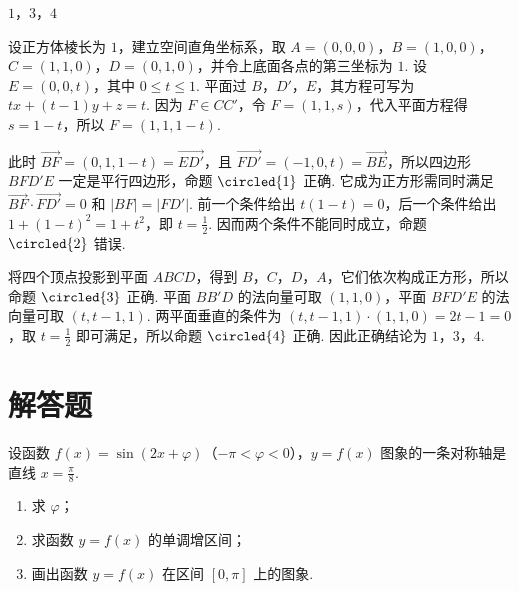 \begin{answer}
\(1\)，\(3\)，\(4\)
\end{answer}

\begin{solution}
设正方体棱长为 \(1\)，建立空间直角坐标系，取 \(A=(0,0,0)\)，\(B=(1,0,0)\)，\(C=(1,1,0)\)，\(D=(0,1,0)\)，并令上底面各点的第三坐标为 \(1\).  设 \(E=(0,0,t)\)，其中 \(0\leqslant t\leqslant1\).  平面过 \(B\)，\(D'\)，\(E\)，其方程可写为 \(tx+(t-1)y+z=t\).  因为 \(F\in CC'\)，令 \(F=(1,1,s)\)，代入平面方程得 \(s=1-t\)，所以 \(F=(1,1,1-t)\).

此时 \(\overrightarrow{BF}=(0,1,1-t)=\overrightarrow{ED'}\)，且 \(\overrightarrow{FD'}=(-1,0,t)=\overrightarrow{BE}\)，所以四边形 \(BFD'E\) 一定是平行四边形，命题 \(\circled{1}\) 正确. 它成为正方形需同时满足 \(\overrightarrow{BF}\cdot\overrightarrow{FD'}=0\) 和 \(|BF|=|FD'|\). 前一个条件给出 \(t(1-t)=0\)，后一个条件给出 \(1+(1-t)^{2}=1+t^{2}\)，即 \(t=\frac{1}{2}\). 因而两个条件不能同时成立，命题 \(\circled{2}\) 错误.

将四个顶点投影到平面 \(ABCD\)，得到 \(B\)，\(C\)，\(D\)，\(A\)，它们依次构成正方形，所以命题 \(\circled{3}\) 正确. 平面 \(BB'D\) 的法向量可取 \((1,1,0)\)，平面 \(BFD'E\) 的法向量可取 \((t,t-1,1)\). 两平面垂直的条件为 \((t,t-1,1)\cdot(1,1,0)=2t-1=0\)，取 \(t=\frac{1}{2}\) 即可满足，所以命题 \(\circled{4}\) 正确. 因此正确结论为 \(1\)，\(3\)，\(4\).
\end{solution}

\section{解答题}
\begin{problem}
设函数 \(f(x)=\sin(2x+\varphi)\)（\(-\pi<\varphi<0\)），\(y=f(x)\) 图象的一条对称轴是直线 \(x=\frac{\pi}{8}\).

\begin{enumerate}
\item 求 \(\varphi\)；
\item 求函数 \(y=f(x)\) 的单调增区间；
\item 画出函数 \(y=f(x)\) 在区间 \([0,\pi]\) 上的图象.
\end{enumerate}
\end{problem}


